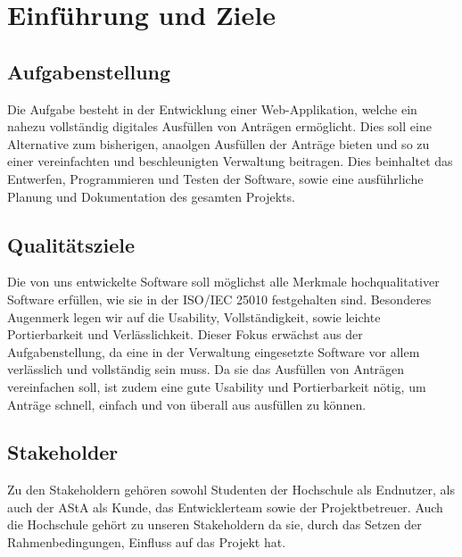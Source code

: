 \chapter{Einführung und Ziele}\label{ch:einfuhrung-und-ziele}

\section{Aufgabenstellung}\label{sec:aufgabenstellung}
Die Aufgabe besteht in der Entwicklung einer Web-Applikation, welche ein nahezu vollständig digitales
Ausfüllen von Anträgen ermöglicht. Dies soll eine Alternative zum bisherigen, anaolgen Ausfüllen der Anträge bieten und so zu einer vereinfachten und beschleunigten Verwaltung beitragen.
Dies beinhaltet das Entwerfen, Programmieren und Testen der Software, sowie eine ausführliche Planung und Dokumentation des gesamten Projekts.

\section{Qualitätsziele}\label{sec:qualitatsziele}
Die von uns entwickelte Software soll möglichst alle Merkmale hochqualitativer Software erfüllen, wie 
sie in der ISO/IEC 25010 festgehalten sind. Besonderes Augenmerk legen wir auf die Usability, 
Vollständigkeit, sowie leichte Portierbarkeit und Verlässlichkeit. Dieser Fokus erwächst aus der
Aufgabenstellung, da eine in der Verwaltung eingesetzte Software vor allem verlässlich und vollständig
sein muss. Da sie das Ausfüllen von Anträgen vereinfachen soll, ist zudem eine gute Usability und
Portierbarkeit nötig, um Anträge schnell, einfach und von überall aus ausfüllen zu können.

\section{Stakeholder}\label{sec:stakeholder}
Zu den Stakeholdern gehören sowohl Studenten der Hochschule als Endnutzer, als auch
der AStA als Kunde, das Entwicklerteam sowie der Projektbetreuer. Auch die Hochschule 
gehört zu unseren Stakeholdern da sie, durch das Setzen der Rahmenbedingungen, Einfluss auf das 
Projekt hat.